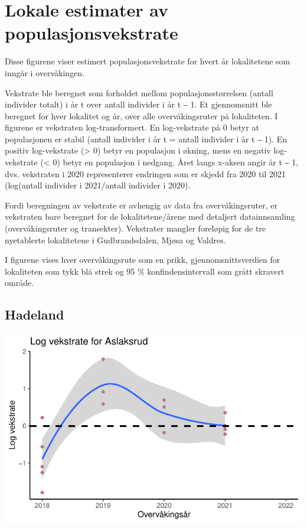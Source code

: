 \documentclass[
  letterpaper,
  DIV=11,
  numbers=noendperiod]{scrreport}
\begin{document}
\hypertarget{section}{%
\section{}\label{section}}


\hypertarget{lokale-estimater-av-populasjonsvekstrate}{%
\chapter{Lokale estimater av
populasjonsvekstrate}\label{lokale-estimater-av-populasjonsvekstrate}}

Disse figurene viser estimert populasjonsvekstrate for hvert år
lokalitetene som inngår i overvåkingen.

Vekstrate ble beregnet som forholdet mellom populasjonsstørrelsen
(antall individer totalt) i år t over antall individer i år t ‒ 1. Et
gjennomsnitt ble beregnet for hver lokalitet og år, over alle
overvåkingsruter på lokaliteten. I figurene er vekstraten
log-transformert. En log-vekstrate på 0 betyr at populasjonen er stabil
(antall individer i år t = antall individer i år t ‒ 1). En positiv
log-vekstrate (\textgreater{} 0) betyr en populasjon i økning, mens en
negativ log-vekstrate (\textless{} 0) betyr en populasjon i nedgang.
Året langs x-aksen angir år t ‒ 1, dvs. vekstraten i 2020 representerer
endringen som er skjedd fra 2020 til 2021 (log(antall individer i
2021/antall individer i 2020).

Fordi beregningen av vekstrate er avhengig av data fra overvåkingsruter,
er vekstraten bare beregnet for de lokalitetene/årene med detaljert
datainnsamling (overvåkingsruter og transekter). Vekstrater mangler
foreløpig for de tre nyetablerte lokalitetene i Gudbrandsdalen, Mjøsa og
Valdres.

I figurene vises hver overvåkingsrute som en prikk, gjennomsnittsverdien
for lokaliteten som tykk blå strek og 95 \% konfindensintervall som
grått skravert område.

\hypertarget{hadeland-1}{%
\section{Hadeland}\label{hadeland-1}}

\includegraphics{growthRate_files/figure-pdf/unnamed-chunk-3-1.pdf}
\end{document}
